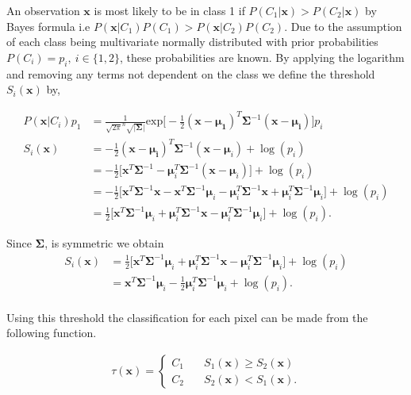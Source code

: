 \documentclass{article}
\begin{document}
An observation $\textbf{x}$ is most likely to be in class 1 if $P(C_1|\textbf{x})>P(C_2|\textbf{x})$ by Bayes formula i.e $P(\textbf{x}|C_1)P(C_1)>P(\textbf{x}|C_2)P(C_2)$. Due to the assumption of each class being multivariate normally distributed with prior probabilities $P(C_i)=p_i,\:i\in\{1,2\}$, these probabilities are known. By applying the logarithm and removing any terms not dependent on the class we define the threshold $S_i(\textbf{x})$ by,

\begin{align*}
    P(\textbf{x}|C_i)p_1&=\frac{1}{\sqrt{2\pi}^n\sqrt{|\boldsymbol{\Sigma}}|}\text{exp}\bigg[-\frac{1}{2}(\textbf{x}-\boldsymbol{\mu_1})^T\boldsymbol{\Sigma}^{-1}(\textbf{x}-\boldsymbol{\mu_i})\bigg]p_i \\
    S_i(\textbf{x})&=-\frac{1}{2}(\textbf{x}-\boldsymbol{\mu_i})^T\boldsymbol{\Sigma}^{-1}(\textbf{x}-\boldsymbol{\mu}_i)+\log(p_i) \\
    &=-\frac{1}{2}\big[\textbf{x}^T\boldsymbol{\Sigma}^{-1}-\boldsymbol{\mu}^T_i\boldsymbol{\Sigma}^{-1}(\textbf{x}-\boldsymbol{\mu}_i)]+\log(p_i)\\
    &=-\frac{1}{2}\big[\textbf{x}^T\boldsymbol{\Sigma}^{-1}\textbf{x}-\textbf{x}^T\boldsymbol{\Sigma}^{-1}\boldsymbol{\mu}_i-\boldsymbol{\mu}_i^T\boldsymbol{\Sigma}^{-1}\textbf{x}+\boldsymbol{\mu}_i^T\boldsymbol{\Sigma}^{-1}\boldsymbol{\mu}_i\big]+\log(p_i) \\
    &=\frac{1}{2}\big[\textbf{x}^T\boldsymbol{\Sigma}^{-1}\boldsymbol{\mu}_i+\boldsymbol{\mu}_i^T\boldsymbol{\Sigma}^{-1}\textbf{x}-\boldsymbol{\mu}_i^T\boldsymbol{\Sigma}^{-1}\boldsymbol{\mu}_i\big]+\log(p_i).
\end{align*}

Since $\boldsymbol{\Sigma}$, is symmetric we obtain  
\begin{align*}
    S_i(\textbf{x})&=\frac{1}{2}\big[\textbf{x}^T\boldsymbol{\Sigma}^{-1}\boldsymbol{\mu}_i+\boldsymbol{\mu}_i^T\boldsymbol{\Sigma}^{-1}\textbf{x}-\boldsymbol{\mu}_i^T\boldsymbol{\Sigma}^{-1}\boldsymbol{\mu}_i\big]+\log(p_i)\\
    &=\textbf{x}^T\boldsymbol{\Sigma}^{-1}\boldsymbol{\mu}_i-\frac{1}{2}\boldsymbol{\mu}_i^T\boldsymbol{\Sigma}^{-1}\boldsymbol{\mu}_i+\log(p_i).\\
\end{align*}

Using this threshold the classification for each pixel can be made from the following function.

\begin{align*}
    \tau(\textbf{x})=\begin{cases}
        C_1 \quad & S_1(\textbf{x})\geq S_2(\textbf{x}) \\
        C_2 \quad & S_2(\textbf{x})<S_1(\textbf{x}).
    \end{cases}
\end{align*}
\end{document}
